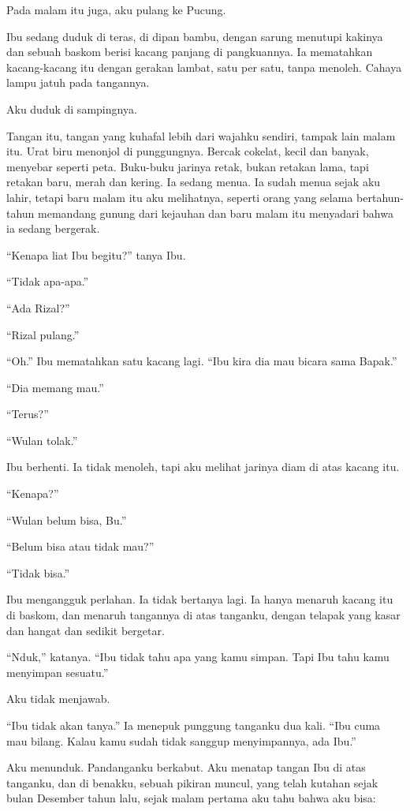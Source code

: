 \documentclass[11pt,twoside,openany]{book}
\makeatletter
\newcommand{\scenebreak}{\par\vspace{0.9em}{\centering\textsc{*\hspace{0.7em}*\hspace{0.7em}*}\par}\vspace{0.9em}\@afterindentfalse\@afterheading}
\makeatother
\begin{document}
\scenebreak
Pada malam itu juga, aku pulang ke Pucung.

Ibu sedang duduk di teras, di dipan bambu, dengan sarung menutupi kakinya dan sebuah baskom berisi kacang panjang di pangkuannya. Ia mematahkan kacang-kacang itu dengan gerakan lambat, satu per satu, tanpa menoleh. Cahaya lampu jatuh pada tangannya.

Aku duduk di sampingnya.

Tangan itu, tangan yang kuhafal lebih dari wajahku sendiri, tampak lain malam itu. Urat biru menonjol di punggungnya. Bercak cokelat, kecil dan banyak, menyebar seperti peta. Buku-buku jarinya retak, bukan retakan lama, tapi retakan baru, merah dan kering. Ia sedang menua. Ia sudah menua sejak aku lahir, tetapi baru malam itu aku melihatnya, seperti orang yang selama bertahun-tahun memandang gunung dari kejauhan dan baru malam itu menyadari bahwa ia sedang bergerak.

``Kenapa liat Ibu begitu?'' tanya Ibu.

``Tidak apa-apa.''

``Ada Rizal?''

``Rizal pulang.''

``Oh.'' Ibu mematahkan satu kacang lagi. ``Ibu kira dia mau bicara sama Bapak.''

``Dia memang mau.''

``Terus?''

``Wulan tolak.''

Ibu berhenti. Ia tidak menoleh, tapi aku melihat jarinya diam di atas kacang itu.

``Kenapa?''

``Wulan belum bisa, Bu.''

``Belum bisa atau tidak mau?''

``Tidak bisa.''

Ibu mengangguk perlahan. Ia tidak bertanya lagi. Ia hanya menaruh kacang itu di baskom, dan menaruh tangannya di atas tanganku, dengan telapak yang kasar dan hangat dan sedikit bergetar.

``Nduk,'' katanya. ``Ibu tidak tahu apa yang kamu simpan. Tapi Ibu tahu kamu menyimpan sesuatu.''

Aku tidak menjawab.

``Ibu tidak akan tanya.'' Ia menepuk punggung tanganku dua kali. ``Ibu cuma mau bilang. Kalau kamu sudah tidak sanggup menyimpannya, ada Ibu.''

Aku menunduk. Pandanganku berkabut. Aku menatap tangan Ibu di atas tanganku, dan di benakku, sebuah pikiran muncul, yang telah kutahan sejak bulan Desember tahun lalu, sejak malam pertama aku tahu bahwa aku bisa:
\end{document}
